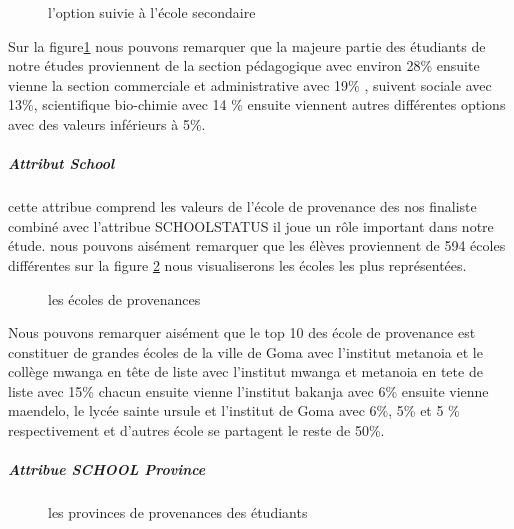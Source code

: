 \begin{figure}[!htbp]
	\centering
	\caption{l'option suivie à l'école secondaire }
	\label{fig:Option_right}
\end{figure}
Sur la figure\ref{fig:Option_right} nous pouvons remarquer que la majeure partie des
étudiants de notre études proviennent de la section pédagogique avec
environ 28\% ensuite vienne la section commerciale et administrative
avec 19\% , suivent sociale avec 13\%, scientifique bio-chimie avec 14
\% ensuite viennent autres différentes options avec des valeurs
inférieurs à 5\%.
\subparagraph{Attribut School}\label{attribut-school}
cette attribue comprend les valeurs de l'école de provenance des nos
finaliste combiné avec l'attribue SCHOOLSTATUS  il joue un rôle
important dans notre étude.
nous pouvons aisément remarquer que les élèves proviennent de 594 écoles
différentes sur la figure \ref{fig:SCHOOL} nous visualiserons les écoles
les plus représentées.
\begin{figure}[!htbp]
	\centering
	\caption{les écoles de provenances  }
	\label{fig:SCHOOL}
\end{figure}
Nous pouvons remarquer aisément que le top 10 des école de provenance
est constituer de grandes écoles de la ville de Goma avec l'institut
metanoia et le collège mwanga en tête de liste avec l'institut mwanga et
metanoia en tete de liste avec 15\% chacun ensuite vienne l'institut
bakanja avec 6\% ensuite vienne maendelo, le lycée sainte ursule et
l'institut de Goma avec 6\%, 5\% et 5 \% respectivement et d'autres
école se partagent le reste de 50\%.
\subparagraph{Attribue SCHOOL Province}
\begin{figure}[!htbp]
	\centering
	\caption{les provinces de provenances des étudiants   }
	\label{fig:SCHOOLProvince}
\end{figure}
